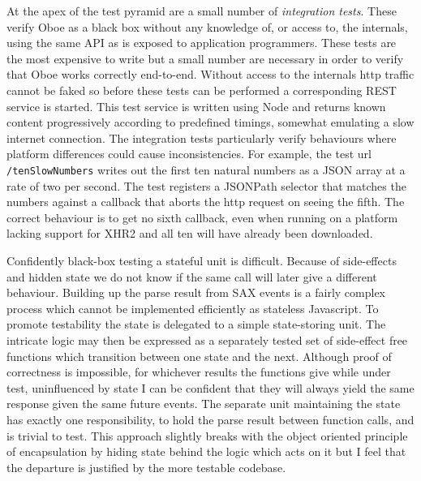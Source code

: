 \documentclass[]{article}
\begin{document}
At the apex of the test pyramid are a small number of \emph{integration
tests}. These verify Oboe as a black box without any knowledge of, or
access to, the internals, using the same API as is exposed to
application programmers. These tests are the most expensive to write but
a small number are necessary in order to verify that Oboe works
correctly end-to-end. Without access to the internals http traffic
cannot be faked so before these tests can be performed a corresponding
REST service is started. This test service is written using Node and
returns known content progressively according to predefined timings,
somewhat emulating a slow internet connection. The integration tests
particularly verify behaviours where platform differences could cause
inconsistencies. For example, the test url \texttt{/tenSlowNumbers}
writes out the first ten natural numbers as a JSON array at a rate of
two per second. The test registers a JSONPath selector that matches the
numbers against a callback that aborts the http request on seeing the
fifth. The correct behaviour is to get no sixth callback, even when
running on a platform lacking support for XHR2 and all ten will have
already been downloaded.

Confidently black-box testing a stateful unit is difficult. Because of
side-effects and hidden state we do not know if the same call will later
give a different behaviour. Building up the parse result from SAX events
is a fairly complex process which cannot be implemented efficiently as
stateless Javascript. To promote testability the state is delegated to a
simple state-storing unit. The intricate logic may then be expressed as
a separately tested set of side-effect free functions which transition
between one state and the next. Although proof of correctness is
impossible, for whichever results the functions give while under test,
uninfluenced by state I can be confident that they will always yield the
same response given the same future events. The separate unit
maintaining the state has exactly one responsibility, to hold the parse
result between function calls, and is trivial to test. This approach
slightly breaks with the object oriented principle of encapsulation by
hiding state behind the logic which acts on it but I feel that the
departure is justified by the more testable codebase.
\end{document}

